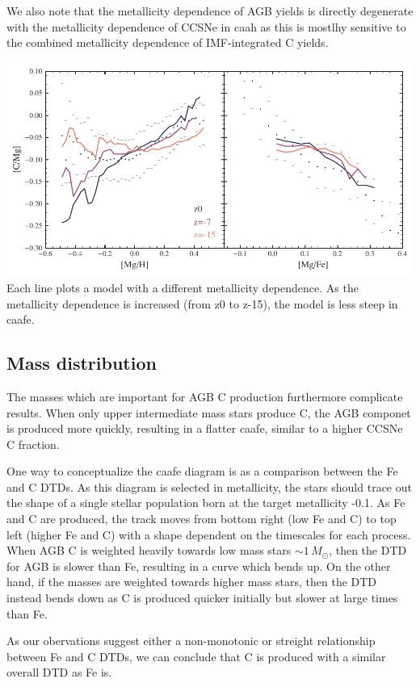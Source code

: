 We also note that the metallicity dependence of AGB yields is directly
degenerate with the metallicity dependence of CCSNe in caah as this is
mostlhy sensitive to the combined metallicity dependence of
IMF-integrated C yields.

\includegraphics{figures/agb_z_dependence.pdf}\\
Each line plots a model with a different metallicity dependence. As the
metallicity dependence is increased (from z0 to z-15), the model is less
steep in caafe.

\hypertarget{mass-distribution}{%
\subsection{Mass distribution}\label{mass-distribution}}

The masses which are important for AGB C production furthermore
complicate results. When only upper intermediate mass stars produce C,
the AGB componet is produced more quickly, resulting in a flatter caafe,
similar to a higher CCSNe C fraction.

One way to conceptualize the caafe diagram is as a comparison between
the Fe and C DTDs. As this diagram is selected in metallicity, the stars
should trace out the shape of a single stellar population born at the
target metallicity -0.1. As Fe and C are produced, the track moves from
bottom right (low Fe and C) to top left (higher Fe and C) with a shape
dependent on the timescales for each process. When AGB C is weighted
heavily towards low mass stars \(\sim 1\,M_\odot\), then the DTD for AGB
is slower than Fe, resulting in a curve which bends up. On the other
hand, if the masses are weighted towards higher mass stars, then the DTD
instead bends down as C is produced quicker initially but slower at
large times than Fe.

As our obervations suggest either a non-monotonic or streight
relationship between Fe and C DTDs, we can conclude that C is produced
with a similar overall DTD as Fe is.

